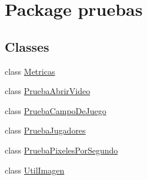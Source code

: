 \hypertarget{namespacepruebas}{}\section{Package pruebas}
\label{namespacepruebas}
\subsection*{Classes}
\begin{DoxyCompactItemize}
\item 
class \hyperlink{classpruebas_1_1_metricas}{Metricas}
\item 
class \hyperlink{classpruebas_1_1_prueba_abrir_video}{Prueba\+Abrir\+Video}
\item 
class \hyperlink{classpruebas_1_1_prueba_campo_de_juego}{Prueba\+Campo\+De\+Juego}
\item 
class \hyperlink{classpruebas_1_1_prueba_jugadores}{Prueba\+Jugadores}
\item 
class \hyperlink{classpruebas_1_1_prueba_pixeles_por_segundo}{Prueba\+Pixeles\+Por\+Segundo}
\item 
class \hyperlink{classpruebas_1_1_util_imagen}{Util\+Imagen}
\end{DoxyCompactItemize}
